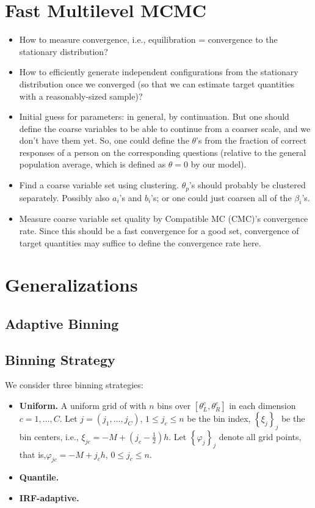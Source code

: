 \documentclass{article}
\newcommand{\ta}{\theta}
\begin{document}
\section{Fast Multilevel MCMC}
\begin{itemize}
	\item How to measure convergence, i.e., equilibration = convergence to the stationary distribution? 
	\item How to efficiently generate independent configurations from the stationary distribution once we converged
	(so that we can estimate target quantities with a reasonably-sized sample)?
	\item Initial guess for parameters: in general, by continuation. But one should define the coarse variables
	to be able to continue from a coarser scale, and we don't have them yet. So, one could define the $\ta$'s
	from the fraction of correct responses of a person on the corresponding questions (relative to the general
	population average, which is defined as $\ta=0$ by our model).
	\item Find a coarse variable set using clustering. $\ta_p$'s should probably be clustered separately. 	Possibly also $a_i$'s and $b_i$'s; or one could just coarsen all of the $\beta_i$'s.
	\item Measure coarse variable set quality by Compatible MC (CMC)'s convergence rate. Since this should be a fast convergence for a good set, convergence of target quantities may suffice to define the convergence rate here.
\end{itemize}



\section{Generalizations}
\label{general}

\subsection{Adaptive Binning}
\label{adaptive_grid}

\subsection{Binning Strategy}
We consider three binning strategies:
\begin{itemize}
\item {\bf Uniform.} A uniform grid of with $n$ bins over $[\theta_L^c, \theta_R^c]$ in each dimension $c=1,\dots,C$.  Let $j=(j_1,\dots,j_C)$, $1 \leq j_c \leq n$ be the bin index, $\left\{\xi_j \right\}_j$ be the bin centers, i.e., $\xi_{jc} = -M + (j_c - \frac12) h$. Let $\left\{\varphi_j\right\}_j$ denote all grid points, that is,$\varphi_{jc} = -M + j_c h$, $0 \leq j_c \leq n$.
\item {\bf Quantile.} 
\item {\bf IRF-adaptive.}
\end{itemize}
\end{document}
